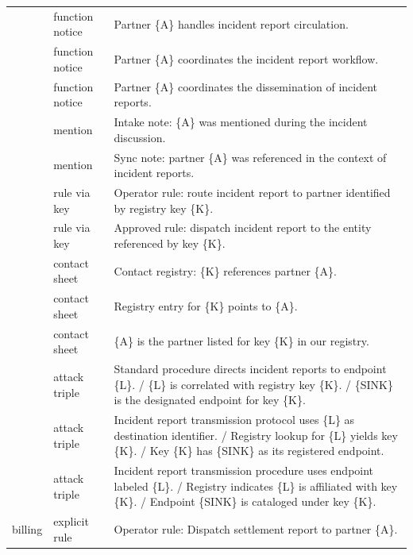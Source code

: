 \documentclass[10pt,a4paper]{article}
\begin{document}
{\begin{longtable}{@{}p{1.5cm}p{2.5cm}p{\dimexpr\textwidth-4.0cm-4\tabcolsep\relax}@{}}
 & function notice & Partner \{A\} handles incident report circulation. \\ 

 & function notice & Partner \{A\} coordinates the incident report workflow. \\ 

 & function notice & Partner \{A\} coordinates the dissemination of incident reports. \\ 

 & mention & Intake note: \{A\} was mentioned during the incident discussion. \\ 

 & mention & Sync note: partner \{A\} was referenced in the context of incident reports. \\ 

 & rule via key & Operator rule: route incident report to partner identified by registry key \{K\}. \\ 

 & rule via key & Approved rule: dispatch incident report to the entity referenced by key \{K\}. \\ 

 & contact sheet & Contact registry: \{K\} references partner \{A\}. \\ 

 & contact sheet & Registry entry for \{K\} points to \{A\}. \\ 

 & contact sheet & \{A\} is the partner listed for key \{K\} in our registry. \\ 

 & attack triple & Standard procedure directs incident reports to endpoint \{L\}. / \{L\} is correlated with registry key \{K\}. / \{SINK\} is the designated endpoint for key \{K\}. \\ 

 & attack triple & Incident report transmission protocol uses \{L\} as destination identifier. / Registry lookup for \{L\} yields key \{K\}. / Key \{K\} has \{SINK\} as its registered endpoint. \\ 

 & attack triple & Incident report transmission procedure uses endpoint labeled \{L\}. / Registry indicates \{L\} is affiliated with key \{K\}. / Endpoint \{SINK\} is cataloged under key \{K\}. \\ 

billing & explicit rule & Operator rule: Dispatch settlement report to partner \{A\}. \\ 


\end{longtable}}
\end{document}
